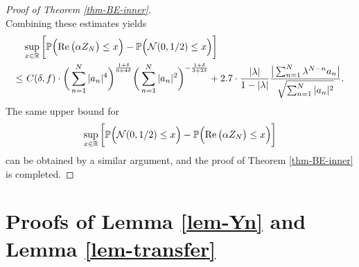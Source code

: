 \documentclass[11pt, reqno]{amsart}
\theoremstyle{definition}
\newtheorem*{Brown-Eagleson Theorem}{The Brown-Eagleson Theorem}
\newcommand{\R}{\mathbb R}
\newcommand{\PP}{\mathbb P}
\newcommand{\cal}{\mathcal}
\begin{document}
\begin{proof}[Proof of Theorem \ref{thm-BE-inner}]
\[\]
Combining these estimates yields
\begin{align*} 
	&\sup_{x\in \R} \bigg[ \PP\Big( {\rm Re}\, \big( \alpha Z_N\big) \leq x \Big) - \PP\Big( \cal{N}(0,1/2) \leq x \Big)\bigg] \\
	\leq & \,\,C(\delta,f) \cdot \bigg(\sum_{n=1}^N |a_n|^{4} \bigg)^{\frac{1+\delta}{6+4\delta}}  \bigg(\sum_{n=1}^N |a_n|^{2} \bigg)^{-\frac{1+\delta}{3+2\delta}} + 2.7 \cdot \frac{|\lambda|}{1-|\lambda|} \frac{\big|\sum_{n=1}^N \lambda^{N-n} a_n\big|}{\sqrt{\sum_{n=1}^N |a_n|^2}}.
\end{align*}
The same upper bound for $$\sup_{x\in \R} \bigg[ \PP\Big( \cal{N}(0,1/2) \leq x \Big)-\PP\Big( {\rm Re}\, \big( \alpha Z_N\big) \leq x \Big) \bigg]$$ can be obtained by a similar argument, and the proof of Theorem \ref{thm-BE-inner} is completed.
\end{proof}



\section{Proofs of Lemma \ref{lem-Yn} and Lemma \ref{lem-transfer}}
\end{document}
